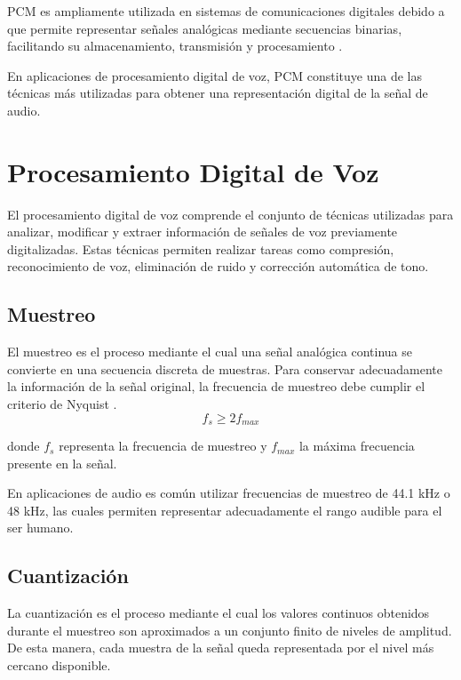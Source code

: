 \documentclass[12pt]{article}
\begin{document}
PCM es ampliamente utilizada en sistemas de comunicaciones digitales debido a que permite representar señales analógicas mediante secuencias binarias, facilitando su almacenamiento, transmisión y procesamiento \cite{pcm}.

En aplicaciones de procesamiento digital de voz, PCM constituye una de las técnicas más utilizadas para obtener una representación digital de la señal de audio.



\section{Procesamiento Digital de Voz}

El procesamiento digital de voz comprende el conjunto de técnicas utilizadas para analizar, modificar y extraer información de señales de voz previamente digitalizadas. Estas técnicas permiten realizar tareas como compresión, reconocimiento de voz, eliminación de ruido y corrección automática de tono.



\subsection{Muestreo}

El muestreo es el proceso mediante el cual una señal analógica continua se convierte en una secuencia discreta de muestras. Para conservar adecuadamente la información de la señal original, la frecuencia de muestreo debe cumplir el criterio de Nyquist \cite{nyquist}.
\begin{equation}
f_s \geq 2f_{max}
\end{equation}

donde $f_s$ representa la frecuencia de muestreo y $f_{max}$ la máxima frecuencia presente en la señal.

En aplicaciones de audio es común utilizar frecuencias de muestreo de 44.1 kHz o 48 kHz, las cuales permiten representar adecuadamente el rango audible para el ser humano.



\subsection{Cuantización}

La cuantización es el proceso mediante el cual los valores continuos obtenidos durante el muestreo son aproximados a un conjunto finito de niveles de amplitud. De esta manera, cada muestra de la señal queda representada por el nivel más cercano disponible.
\end{document}
